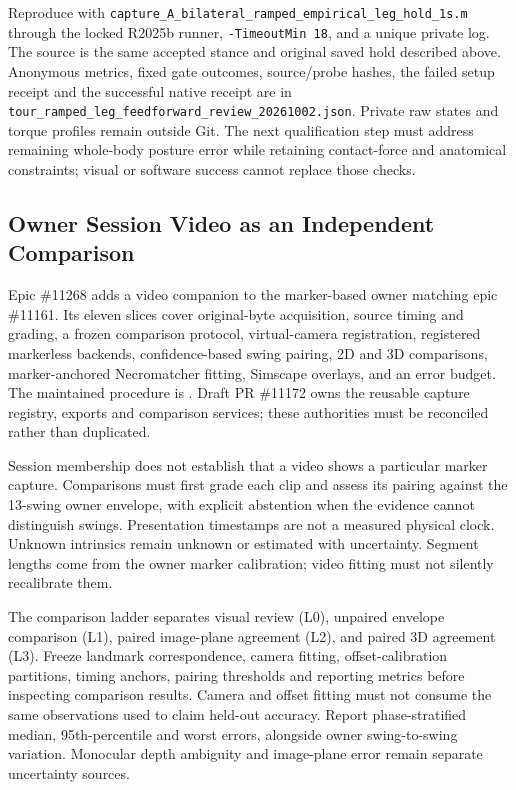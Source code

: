 \documentclass[11pt,a4paper]{article}
\begin{document}
Reproduce with \texttt{capture\_A\_bilateral\_ramped\_empirical\_leg\_hold\_1s.m}
through the locked R2025b runner, \texttt{-TimeoutMin 18}, and a unique
private log. The source is the same accepted stance and original saved
hold described above. Anonymous metrics, fixed gate outcomes, source/probe
hashes, the failed setup receipt and the successful native receipt are in
\texttt{tour\_ramped\_leg\_feedforward\_review\_20261002.json}. Private
raw states and torque profiles remain outside Git. The next qualification
step must address remaining whole-body posture error while retaining
contact-force and anatomical constraints; visual or software success
cannot replace those checks.


\subsection{Owner Session Video as an Independent Comparison}
Epic \#11268 adds a video companion to the marker-based owner matching
epic \#11161. Its eleven slices cover original-byte acquisition,
source timing and grading, a frozen comparison protocol, virtual-camera
registration, registered markerless backends, confidence-based swing
pairing, 2D and 3D comparisons, marker-anchored Necromatcher fitting,
Simscape overlays, and an error budget. The maintained procedure is
. Draft PR \#11172
owns the reusable capture registry, exports and comparison services;
these authorities must be reconciled rather than duplicated.

Session membership does not establish that a video shows a particular
marker capture. Comparisons must first grade each clip and assess its
pairing against the 13-swing owner envelope, with explicit abstention
when the evidence cannot distinguish swings. Presentation timestamps
are not a measured physical clock. Unknown intrinsics remain unknown
or estimated with uncertainty. Segment lengths come from the owner
marker calibration; video fitting must not silently recalibrate them.

The comparison ladder separates visual review (L0), unpaired envelope
comparison (L1), paired image-plane agreement (L2), and paired 3D
agreement (L3). Freeze landmark correspondence, camera fitting,
offset-calibration partitions, timing anchors, pairing thresholds and
reporting metrics before inspecting comparison results. Camera and
offset fitting must not consume the same observations used to claim
held-out accuracy. Report phase-stratified median, 95th-percentile and
worst errors, alongside owner swing-to-swing variation. Monocular depth
ambiguity and image-plane error remain separate uncertainty sources.
\end{document}

